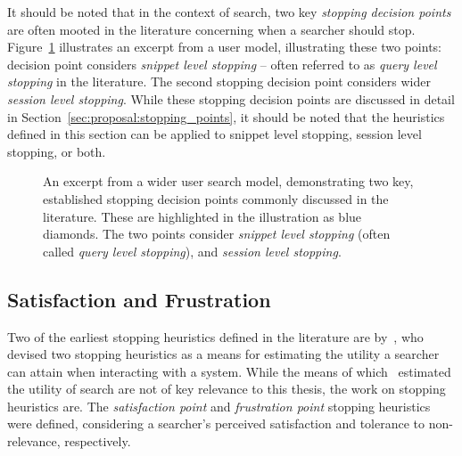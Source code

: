 It should be noted that in the context of search, two key \emph{stopping decision points} are often mooted in the literature concerning when a searcher should stop. Figure~\ref{fig:model_two_points} illustrates an excerpt from a user model, illustrating these two points: decision point  considers \emph{snippet level stopping} -- often referred to as \emph{query level stopping} in the literature. The second stopping decision point  considers wider \emph{session level stopping}. While these stopping decision points are discussed in detail in Section~\ref{sec:proposal:stopping_points}, it should be noted that the heuristics defined in this section can be applied to snippet level stopping, session level stopping, or both.

\begin{figure}[t!]
    \centering
    \caption[Two main stopping decision points of the search process]{An excerpt from a wider user search model, demonstrating two key, established stopping decision points commonly discussed in the literature. These are highlighted in the illustration as {\color{dmax_lightblue}blue} diamonds. The two points consider  \emph{snippet level stopping} (often called \emph{query level stopping}), and  \emph{session level stopping}.}
    \label{fig:model_two_points}
\end{figure}

\subsection{Satisfaction and Frustration}
Two of the earliest stopping heuristics defined in the literature are by~\cite{cooper1973retrieval_effectiveness_ii}, who devised two stopping heuristics as a means for estimating the utility a searcher can attain when interacting with a system. While the means of which~\cite{cooper1973retrieval_effectiveness_ii} estimated the utility of search are not of key relevance to this thesis, the work on stopping heuristics are. The \emph{satisfaction point} and \emph{frustration point} stopping heuristics were defined, considering a searcher's perceived satisfaction and tolerance to non-relevance, respectively.

